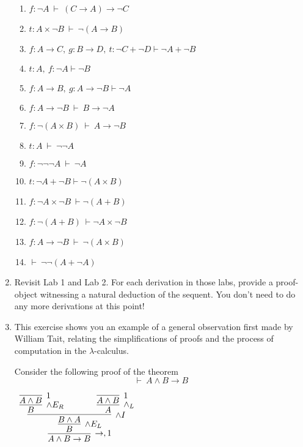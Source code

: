 \documentclass[11pt]{report}
\begin{document}
\begin{enumerate}
		\begin{enumerate}
			\item $f : \lnot A \ \vdash \ (C \to A) \to \lnot C$
			\item $t : A \times \lnot B \ \vdash \ \lnot (A \to B)$
			\item $f : A \to  C, \  g : B \to  D, \ t : \neg C + \neg  D \vdash  \neg A+ \neg  B$
			\item $ t : A, \ f : \neg  A\vdash  \neg  B$
			\item $ f : A\rightarrow B, \  g : A\rightarrow \lnot B \vdash \lnot  A$
			\item $f : A \to \lnot B \ \vdash \ B \to \lnot A$
			\item $f : \lnot (A \times B) \ \vdash \ A \to \lnot B$
			\item $t : A \ \vdash \ \lnot\lnot A$
			\item $f : \lnot \lnot \lnot A \ \vdash \ \lnot A$
			\item $t : \lnot A + \lnot B \vdash \lnot( A\times  B)$
			\item $f : \lnot  A\times \lnot  B \ \vdash \lnot( A +  B)$
			\item $f : \lnot( A +  B) \ \vdash \lnot  A\times \lnot  B$
			\item $f : A \to \lnot B \ \vdash \ \lnot (A \times B)$
			\item $\vdash \ \lnot\lnot (A + \lnot A)$
		\end{enumerate}

	\item Revisit Lab 1 and Lab 2. For each derivation in those labs, provide a proof-object witnessing a natural deduction of the sequent. You don't need to do any more derivations at this point!

	\newpage
	\item This exercise shows you an example of a general observation first made by William Tait, relating the simplifications of proofs and the process of computation in the $\lambda$-calculus. 
	
	Consider the following proof of the theorem $$\vdash \ A \land B \to B$$
	
	\begin{center}
		$\begin{array}{c}		
		  \infer[\to, 1]{A \land B \to B}
		  	{\infer[\land E_{L}]{B}
				{\infer[\land I]{B \land A}
					{\infer[\land E_{R}]{B}{\infer[1]{A \land B}{}} 
					\hspace{0.5cm}	&	\hspace{0.5cm}
					\infer[\land_{L}]{A}{\infer[1]{A \land B}{}}}}}
		\end{array}$
	  \end{center}


\end{enumerate}
\end{document}
